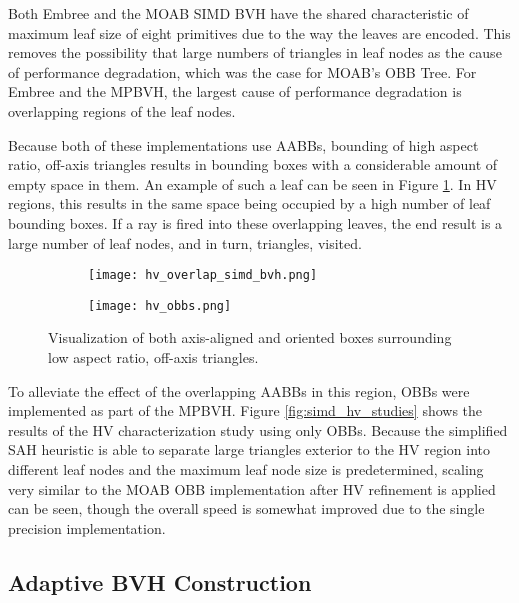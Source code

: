 Both Embree and the MOAB SIMD BVH have the shared characteristic of maximum leaf
size of eight primitives due to the way the leaves are encoded. This removes the
possibility that large numbers of triangles in leaf nodes as the cause of
performance degradation, which was the case for MOAB's OBB Tree. For Embree and
the MPBVH, the largest cause of performance degradation is overlapping regions
of the leaf nodes.

Because both of these implementations use AABBs, bounding of high aspect ratio,
off-axis triangles results in bounding boxes with a considerable amount of empty
space in them. An example of such a leaf can be seen in Figure
\ref{fig:hv_overlap_simd_bvh}. In HV regions, this results in the same
space being occupied by a high number of leaf bounding boxes. If a ray is fired
into these overlapping leaves, the end result is a large number of leaf nodes,
and in turn, triangles, visited.

\begin{figure}
  \centering
  \begin{subfigure}{.5\textwidth}
    \centering
    \texttt{[image: hv\_overlap\_simd\_bvh.png]}
  \end{subfigure}%
  \begin{subfigure}{.5\textwidth}
    \centering
    \texttt{[image: hv\_obbs.png]}
  \end{subfigure}
  \caption[Bounding boxes of the MPBVH in the high valence
    region.]{Visualization of both axis-aligned and oriented boxes surrounding
    low aspect ratio, off-axis triangles.}
  \label{fig:hv_overlap_simd_bvh}
\end{figure}

To alleviate the effect of the overlapping AABBs in this region, OBBs were
implemented as part of the MPBVH. Figure \ref{fig:simd_hv_studies} shows the
results of the HV characterization study using only OBBs. Because the simplified SAH heuristic is able to separate
large triangles exterior to the HV region into different leaf nodes and the
maximum leaf node size is predetermined, scaling very similar to the MOAB OBB
implementation after HV refinement is applied can be seen, though the overall
speed is somewhat improved due to the single precision implementation.

\subsection{Adaptive BVH Construction}


